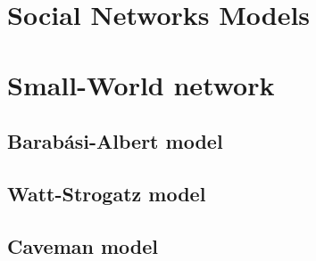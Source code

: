 \section{Social Networks Models}
\label{social_networks}


\section{Small-World network}
\label{sn_smallworld}


\subsection{Barabási-Albert model}
\label{sn_ba_model}


\subsection{Watt-Strogatz model}
\label{sn_ws_model}

\subsection{Caveman model}
\label{sn_caveman_model}




